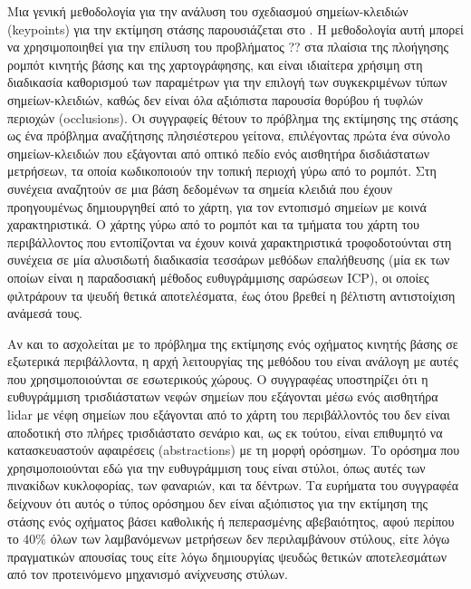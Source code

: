 Μια γενική μεθοδολογία για την ανάλυση του σχεδιασμού σημείων-κλειδιών
(keypoints) για την εκτίμηση στάσης παρουσιάζεται στο \cite{Bosse2009}. Η
μεθοδολογία αυτή μπορεί να χρησιμοποιηθεί για την επίλυση του προβλήματος ??
στα πλαίσια της πλοήγησης ρομπότ κινητής βάσης και της χαρτογράφησης, και είναι
ιδιαίτερα χρήσιμη στη διαδικασία καθορισμού των παραμέτρων για την επιλογή των
συγκεκριμένων τύπων σημείων-κλειδιών, καθώς δεν είναι όλα αξιόπιστα παρουσία
θορύβου ή τυφλών περιοχών (occlusions). Οι συγγραφείς θέτουν το πρόβλημα της
εκτίμησης της στάσης ως ένα πρόβλημα αναζήτησης πλησιέστερου γείτονα,
επιλέγοντας πρώτα ένα σύνολο σημείων-κλειδιών που εξάγονται από οπτικό πεδίο
ενός αισθητήρα δισδιάστατων μετρήσεων, τα οποία κωδικοποιούν την τοπική περιοχή
γύρω από το ρομπότ. Στη συνέχεια αναζητούν σε μια βάση δεδομένων τα σημεία
κλειδιά που έχουν προηγουμένως δημιουργηθεί από το χάρτη, για τον εντοπισμό
σημείων με κοινά χαρακτηριστικά. Ο χάρτης γύρω από το ρομπότ και τα τμήματα του
χάρτη του περιβάλλοντος που εντοπίζονται να έχουν κοινά χαρακτηριστικά
τροφοδοτούνται στη συνέχεια σε μία αλυσιδωτή διαδικασία τεσσάρων μεθόδων
επαλήθευσης (μία εκ των οποίων είναι η παραδοσιακή μέθοδος ευθυγράμμισης
σαρώσεων ICP), οι οποίες φιλτράρουν τα ψευδή θετικά αποτελέσματα, έως ότου
βρεθεί η βέλτιστη αντιστοίχιση ανάμεσά τους.

Αν και το \cite{Brenner2010} ασχολείται με το πρόβλημα της εκτίμησης ενός
οχήματος κινητής βάσης σε εξωτερικά περιβάλλοντα, η αρχή λειτουργίας της
μεθόδου του είναι ανάλογη με αυτές που χρησιμοποιούνται σε εσωτερικούς χώρους.
Ο συγγραφέας υποστηρίζει ότι η ευθυγράμμιση τρισδιάστατων νεφών σημείων που
εξάγονται μέσω ενός αισθητήρα lidar με νέφη σημείων που εξάγονται από το χάρτη
του περιβάλλοντός του δεν είναι αποδοτική στο πλήρες τρισδιάστατο σενάριο και,
ως εκ τούτου, είναι επιθυμητό να κατασκευαστούν αφαιρέσεις (abstractions) με τη
μορφή ορόσημων. Το ορόσημα που χρησιμοποιούνται εδώ για την ευθυγράμμιση τους
είναι στύλοι, όπως αυτές των πινακίδων κυκλοφορίας, των φαναριών, και τα
δέντρων. Τα ευρήματα του συγγραφέα δείχνουν ότι αυτός ο τύπος ορόσημου δεν
είναι αξιόπιστος για την εκτίμηση της στάσης ενός οχήματος βάσει καθολικής ή
πεπερασμένης αβεβαιότητος, αφού περίπου το $40\%$ όλων των λαμβανόμενων
μετρήσεων δεν περιλαμβάνουν στύλους, είτε λόγω πραγματικών απουσίας τους είτε
λόγω δημιουργίας ψευδώς θετικών αποτελεσμάτων από τον προτεινόμενο μηχανισμό
ανίχνευσης στύλων.

